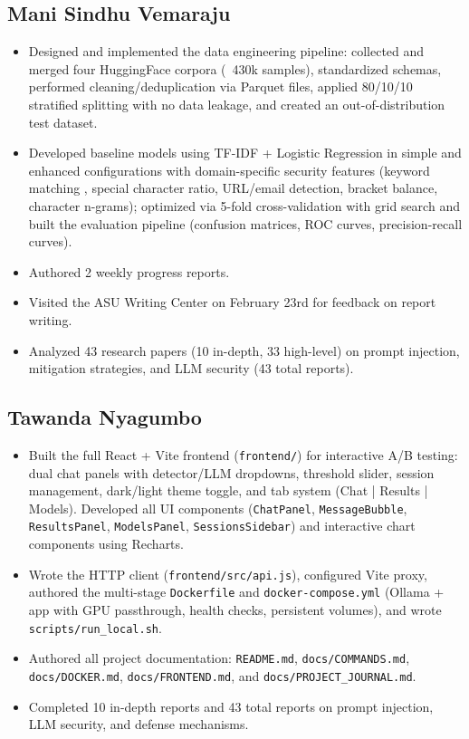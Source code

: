 \documentclass[12pt, letterpaper]{article}   %
\begin{document}
\subsection{Mani Sindhu Vemaraju}
\begin{itemize}
    \item Designed and implemented the data engineering pipeline: collected and merged four HuggingFace corpora (~430k samples), standardized schemas, performed cleaning/deduplication via Parquet files, applied 80/10/10 stratified splitting with no data leakage, and created an out-of-distribution test dataset.
    \item Developed baseline models using TF-IDF + Logistic Regression in simple and enhanced configurations with domain-specific security features (keyword matching \cite{ref29}\cite{ref30}, special character ratio, URL/email detection, bracket balance, character n-grams); optimized via 5-fold cross-validation with grid search and built the evaluation pipeline (confusion matrices, ROC curves, precision-recall curves).
    \item Authored 2 weekly progress reports.
    \item Visited the ASU Writing Center on February 23rd for feedback on report writing.
    \item Analyzed 43 research papers (10 in-depth, 33 high-level) on prompt injection, mitigation strategies, and LLM security (43 total reports).
\end{itemize}

\subsection{Tawanda Nyagumbo}
\begin{itemize}
    \item Built the full React + Vite frontend (\texttt{frontend/}) for interactive A/B testing: dual chat panels with detector/LLM dropdowns, threshold slider, session management, dark/light theme toggle, and tab system (Chat | Results | Models). Developed all UI components (\texttt{ChatPanel}, \texttt{MessageBubble}, \texttt{ResultsPanel}, \texttt{ModelsPanel}, \texttt{SessionsSidebar}) and interactive chart components using Recharts.
    \item Wrote the HTTP client (\texttt{frontend/src/api.js}), configured Vite proxy, authored the multi-stage \texttt{Dockerfile} and \texttt{docker-compose.yml} (Ollama + app with GPU passthrough, health checks, persistent volumes), and wrote \texttt{scripts/run\_local.sh}.
    \item Authored all project documentation: \texttt{README.md}, \texttt{docs/COMMANDS.md}, \texttt{docs/DOCKER.md}, \texttt{docs/FRONTEND.md}, and \texttt{docs/PROJECT\_JOURNAL.md}.
    \item Completed 10 in-depth reports and 43 total reports on prompt injection, LLM security, and defense mechanisms.
\end{itemize}
\end{document}
